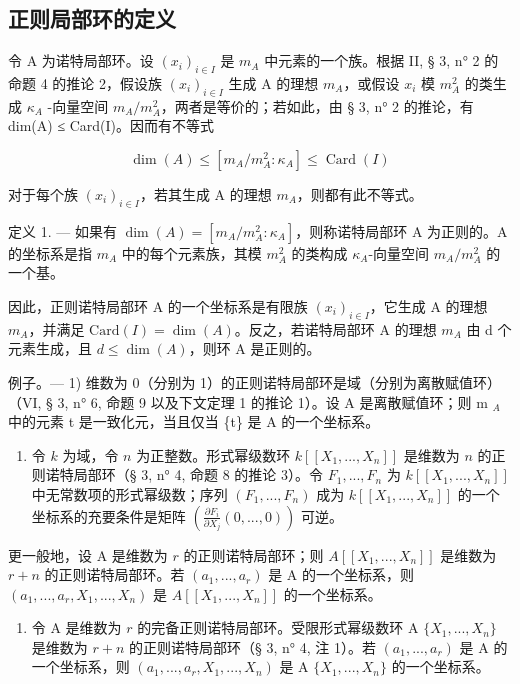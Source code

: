 \subsection{正则局部环的定义}

令 A 为诺特局部环。设 \((x_{i})_{i\in I}\) 是 \(m_{A}\) 中元素的一个族。根据 II, § 3, n° 2 的命题 4 的推论 2，假设族 \((x_{i})_{i\in I}\) 生成 A 的理想 \(m_{A}\)，或假设 \(x_{i}\) 模 \(m_{A}^{2}\) 的类生成 \(\kappa_{A}\) -向量空间 \(m_{A}/m_{A}^{2}\)，两者是等价的；若如此，由 § 3, n° 2 的推论，有 dim(A) ≤ Card(I)。因而有不等式

\[
\dim (A) \leqslant [ m _ {A} / m _ {A} ^ {2}: \kappa_ {A} ] \leqslant \operatorname{Card} (I)\tag{1}
\]

对于每个族 \((x_{i})_{i\in I}\)，若其生成 A 的理想 \(m_{A}\)，则都有此不等式。

定义 1. --- 如果有 \(\dim(A) = [m_A/m_A^2:\kappa_A]\)，则称诺特局部环 A 为正则的。A 的坐标系是指 \(m_A\) 中的每个元素族，其模 \(m_A^2\) 的类构成 \(\kappa_A\)-向量空间 \(m_A/m_A^2\) 的一个基。

因此，正则诺特局部环 A 的一个坐标系是有限族 \((x_{i})_{i\in I}\)，它生成 A 的理想 \(m_{A}\)，并满足 \(\text{Card}(I) = \dim(A)\)。反之，若诺特局部环 A 的理想 \(m_{A}\) 由 d 个元素生成，且 \(d \leqslant \dim(A)\)，则环 A 是正则的。

例子。--- 1) 维数为 0（分别为 1）的正则诺特局部环是域（分别为离散赋值环）（VI, § 3, n° 6, 命题 9 以及下文定理 1 的推论 1）。设 A 是离散赋值环；则 m \(_{A}\) 中的元素 t 是一致化元，当且仅当 \{t\} 是 A 的一个坐标系。

\begin{enumerate}
\def\labelenumi{\arabic{enumi})}
\setcounter{enumi}{1}
\tightlist
\item
  令 \(k\) 为域，令 \(n\) 为正整数。形式幂级数环 \(k[[X_1, ..., X_n]]\) 是维数为 \(n\) 的正则诺特局部环（§ 3, n° 4, 命题 8 的推论 3）。令 \(F_1, ..., F_n\) 为 \(k[[X_1, ..., X_n]]\) 中无常数项的形式幂级数；序列 \((F_1, ..., F_n)\) 成为 \(k[[X_1, ..., X_n]]\) 的一个坐标系的充要条件是矩阵 \(\left(\frac{\partial F_i}{\partial X_j}(0, ..., 0)\right)\) 可逆。
\end{enumerate}

更一般地，设 A 是维数为 \(r\) 的正则诺特局部环；则 \(A[[X_1, ..., X_n]]\) 是维数为 \(r + n\) 的正则诺特局部环。若 \((a_1, ..., a_r)\) 是 A 的一个坐标系，则 \((a_1, ..., a_r, X_1, ..., X_n)\) 是 \(A[[X_1, ..., X_n]]\) 的一个坐标系。

\begin{enumerate}
\def\labelenumi{\arabic{enumi})}
\setcounter{enumi}{2}
\tightlist
\item
  令 A 是维数为 \(r\) 的完备正则诺特局部环。受限形式幂级数环 A \(\{X_1, ..., X_n\}\) 是维数为 \(r + n\) 的正则诺特局部环（§ 3, n° 4, 注 1）。若 \((a_1, ..., a_r)\) 是 A 的一个坐标系，则 \((a_1, ..., a_r, X_1, ..., X_n)\) 是 A \(\{X_1, ..., X_n\}\) 的一个坐标系。
\end{enumerate}

